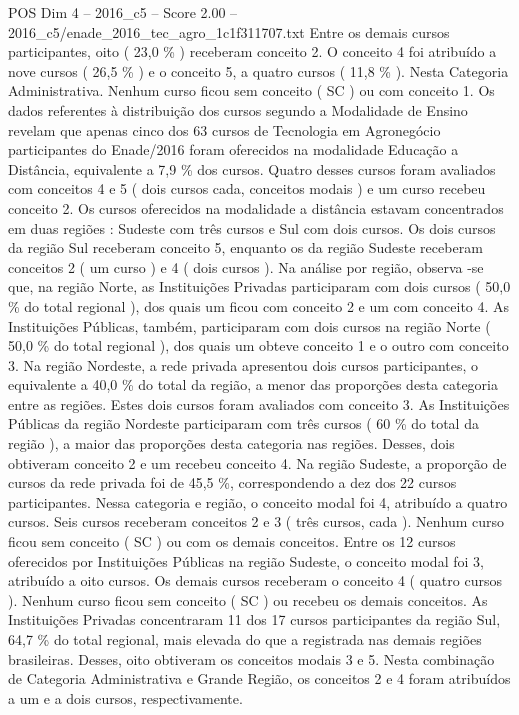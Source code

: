 \begin{textsample}{POS Dim 4 – 2016\_c5 – Score 2.00 – 2016\_c5/enade\_2016\_tec\_agro\_1c1f311707.txt}
Entre os demais cursos participantes, oito ( 23,0 \% ) receberam conceito 2.
O conceito 4 foi atribuído a nove cursos ( 26,5 \% ) e o conceito 5, a quatro cursos ( 11,8 \% ).
Nesta Categoria Administrativa.
Nenhum curso ficou sem conceito ( SC ) ou com conceito 1.
Os dados referentes à distribuição dos cursos segundo a Modalidade de Ensino revelam que apenas cinco dos 63 cursos de Tecnologia em Agronegócio participantes do Enade/2016 foram oferecidos na modalidade Educação a Distância, equivalente a 7,9 \% dos cursos.
Quatro desses cursos foram avaliados com conceitos 4 e 5 ( dois cursos cada, conceitos modais ) e um curso recebeu conceito 2.
Os cursos oferecidos na modalidade a distância estavam concentrados em duas regiões : Sudeste com três cursos e Sul com dois cursos.
Os dois cursos da região Sul receberam conceito 5, enquanto os da região Sudeste receberam conceitos 2 ( um curso ) e 4 ( dois cursos ).
Na análise por região, observa -se que, na região Norte, as Instituições Privadas participaram com dois cursos ( 50,0 \% do total regional ), dos quais um ficou com conceito 2 e um com conceito 4.
As Instituições Públicas, também, participaram com dois cursos na região Norte ( 50,0 \% do total regional ), dos quais um obteve conceito 1 e o outro com conceito 3.
Na região Nordeste, a rede privada apresentou dois cursos participantes, o equivalente a 40,0 \% do total da região, a menor das proporções desta categoria entre as regiões.
Estes dois cursos foram avaliados com conceito 3.
As Instituições Públicas da região Nordeste participaram com três cursos ( 60 \% do total da região ), a maior das proporções desta categoria nas regiões.
Desses, dois obtiveram conceito 2 e um recebeu conceito 4.
Na região Sudeste, a proporção de cursos da rede privada foi de 45,5 \%, correspondendo a dez dos 22 cursos participantes.
Nessa categoria e região, o conceito modal foi 4, atribuído a quatro cursos.
Seis cursos receberam conceitos 2 e 3 ( três cursos, cada ).
Nenhum curso ficou sem conceito ( SC ) ou com os demais conceitos.
Entre os 12 cursos oferecidos por Instituições Públicas na região Sudeste, o conceito modal foi 3, atribuído a oito cursos.
Os demais cursos receberam o conceito 4 ( quatro cursos ).
Nenhum curso ficou sem conceito ( SC ) ou recebeu os demais conceitos.
As Instituições Privadas concentraram 11 dos 17 cursos participantes da região Sul, 64,7 \% do total regional, mais elevada do que a registrada nas demais regiões brasileiras.
Desses, oito obtiveram os conceitos modais 3 e 5.
Nesta combinação de Categoria Administrativa e Grande Região, os conceitos 2 e 4 foram atribuídos a um e a dois cursos, respectivamente.

\end{textsample}
